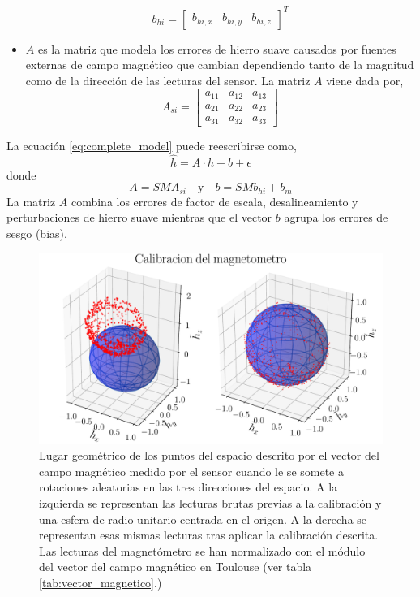 \documentclass[a4paper,12pt]{book}
\begin{document}
\begin{itemize}
    \begin{equation}
    b_{hi} = \begin{bmatrix} b_{hi,x} & b_{hi,y} & b_{hi,z} \end{bmatrix}^T \label{eq:hard_iron}
    \end{equation}
    \item $A$ es la matriz que modela los errores de hierro suave causados por fuentes externas de campo magnético que cambian dependiendo tanto de la magnitud como de la dirección de las lecturas del sensor. La matriz $A$ viene dada por,
    \begin{equation}
    A_{si} = \begin{bmatrix} a_{11} & a_{12} & a_{13} \\ a_{21} & a_{22} & a_{23} \\ a_{31} & a_{32} & a_{33} \end{bmatrix} \label{eq:soft_iron}
    \end{equation}
\end{itemize}

La ecuación \eqref{eq:complete_model} puede reescribirse como,
\begin{equation}
\hat{h} = A \cdot h + b + \epsilon \label{eq:model_expression}
\end{equation}
donde
\begin{equation}
A = S M A_{si} \quad \text{y} \quad b = S M b_{hi} + b_m \label{eq:model_parameters}
\end{equation}
La matriz $A$ combina los errores de factor de escala, desalineamiento y perturbaciones de hierro suave mientras que el vector $b$ agrupa los errores de sesgo (bias).



\begin{figure}[!h]
    \centering
	\includegraphics[width=0.9\linewidth]{magnetometer_cal.pdf}
 	\caption{Lugar geométrico de los puntos del espacio descrito por el vector del campo magnético medido por el sensor cuando le se somete a rotaciones aleatorias en las tres direcciones del espacio. A la izquierda se representan las lecturas brutas previas a la calibración y una esfera de radio unitario centrada en el origen. A la derecha se representan esas mismas lecturas tras aplicar la calibración descrita. Las lecturas del magnetómetro se han normalizado con el módulo del vector del campo magnético en Toulouse (ver tabla \ref{tab:vector_magnetico}.) }
 	\label{fig:mag_cal}
\end{figure}
\end{document}

